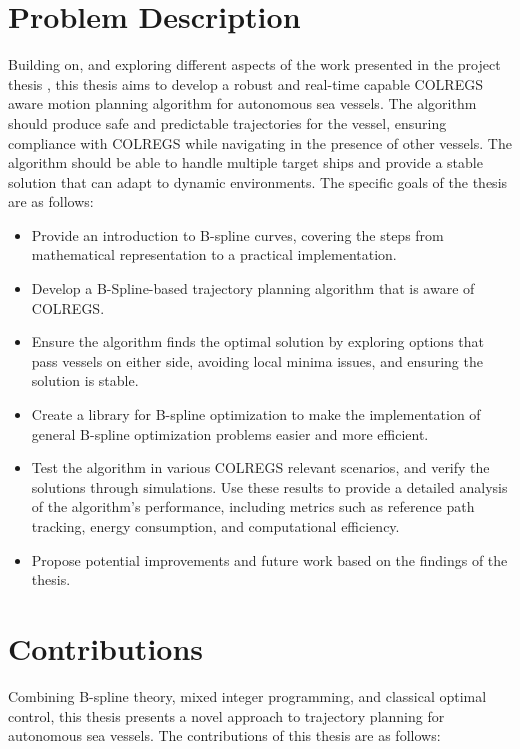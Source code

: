 \section{Problem Description}
Building on, and exploring different aspects of the work presented in the project thesis \citet{prosjektoppgave}, this thesis aims to develop a robust and real-time capable \acrshort{COLREGS} aware motion planning algorithm for autonomous sea vessels. The algorithm should produce safe and predictable trajectories for the vessel, ensuring compliance with \acrshort{COLREGS} while navigating in the presence of other vessels. The algorithm should be able to handle multiple target ships and provide a stable solution that can adapt to dynamic environments. The specific goals of the thesis are as follows:
\begin{itemize}
    \item Provide an introduction to B-spline curves, covering the steps from mathematical representation to a practical implementation.
    \item Develop a B-Spline-based trajectory planning algorithm that is aware of COLREGS.
    \item Ensure the algorithm finds the optimal solution by exploring options that pass vessels on either side, avoiding local minima issues, and ensuring the solution is stable.
    \item Create a library for B-spline optimization to make the implementation of general B-spline optimization problems easier and more efficient.
    \item Test the algorithm in various COLREGS relevant scenarios, and verify the solutions through simulations. Use these results to provide a detailed analysis of the algorithm's performance, including metrics such as reference path tracking, energy consumption, and computational efficiency.
    \item Propose potential improvements and future work based on the findings of the thesis.
\end{itemize}


\section{Contributions}

Combining B-spline theory, mixed integer programming, and classical optimal control, this thesis presents a novel approach to trajectory planning for autonomous sea vessels. The contributions of this thesis are as follows:

